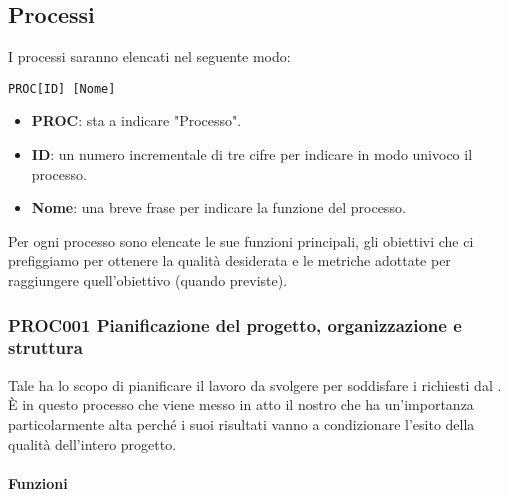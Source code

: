\subsection{Processi}
I processi saranno elencati nel seguente modo:

\begin{center}
	\texttt{PROC[ID] [Nome]}
\end{center}

\begin{itemize}
	\item \textbf{PROC}: sta a indicare "Processo".
	\item \textbf{ID}: un numero incrementale di tre cifre per indicare in modo univoco il processo.
	\item \textbf{Nome}: una breve frase per indicare la funzione del processo.
\end{itemize}

Per ogni processo sono elencate le sue funzioni principali, gli obiettivi che ci prefiggiamo per ottenere la qualità desiderata e le metriche adottate per raggiungere quell'obiettivo (quando previste).

	\subsubsection{PROC001 Pianificazione del progetto, organizzazione e struttura}
	Tale  ha lo scopo di pianificare il lavoro da svolgere per soddisfare i  richiesti dal . È in questo processo che viene messo in atto il nostro  che ha un'importanza particolarmente alta perché i suoi risultati vanno a condizionare l'esito della qualità dell'intero progetto.
	
		\paragraph*{Funzioni}
	
